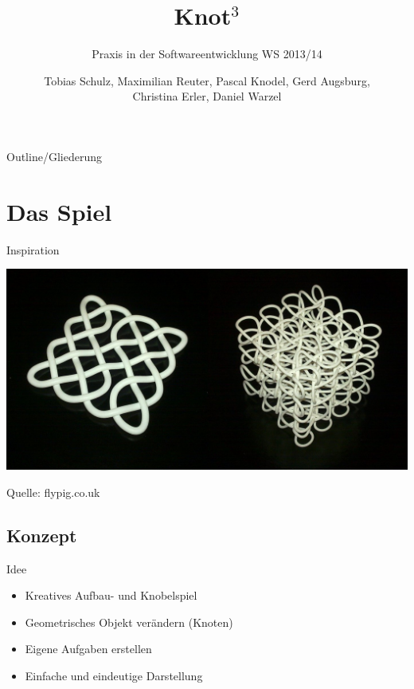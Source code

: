 \documentclass[18pt]{beamer}
\title[]{\huge{Knot$^3$} }
\subtitle{Praxis in der Softwareentwicklung WS 2013/14}
\author{Tobias Schulz, Maximilian Reuter, Pascal Knodel, Gerd Augsburg,\\ Christina Erler, Daniel Warzel}
\institute{Institut für Betriebs- und Dialogsysteme, Lehrstuhl für Computergrafik}
\begin{document}

\begin{frame}
\titlepage
\end{frame}

\begin{frame}{Outline/Gliederung}
\tableofcontents
\end{frame}

\section{Das Spiel}
\begin{frame}{Inspiration}
\begin{center}
\includegraphics[scale=0.23]{Knot}
\end{center}
Quelle: flypig.co.uk
\end{frame}
\subsection{Konzept}
\begin{frame}{Idee}
\begin{itemize}
\item Kreatives Aufbau- und Knobelspiel
\item Geometrisches Objekt verändern (Knoten)
\item Eigene Aufgaben erstellen
\item Einfache und eindeutige Darstellung
\end{itemize}
\end{frame}
\end{document}
